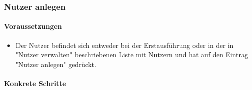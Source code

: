 \subsubsection{Nutzer anlegen}
\paragraph{Voraussetzungen}\mbox{}\newline
\begin{itemize}
\item Der Nutzer befindet sich entweder bei der Erstausführung oder 
in der in "Nutzer verwalten" beschriebenen Liste mit Nutzern und hat auf 
den Eintrag "Nutzer anlegen" gedrückt.
\end{itemize}

\paragraph{Konkrete Schritte}\mbox{}\newline
